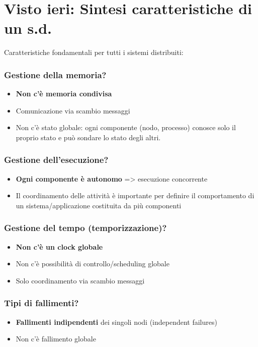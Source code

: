 \section{Visto ieri: Sintesi caratteristiche di un s.d.}
Caratteristiche fondamentali per tutti i sistemi distribuiti:
\subsubsection{Gestione della memoria?}
\begin{itemize}
    \item \textbf{Non c'è memoria condivisa}
    \item Comunicazione via scambio messaggi
    \item Non c'è stato globale: ogni componente (nodo, processo) conosce solo il proprio stato e può sondare lo stato degli altri.
\end{itemize}

\subsubsection{Gestione dell'esecuzione?}
\begin{itemize}
    \item \textbf{Ogni componente è autonomo} => esecuzione concorrente
    \item Il coordinamento delle attività è importante per definire il comportamento di un sistema/applicazione costituita da più componenti
\end{itemize}

\subsubsection{Gestione del tempo (temporizzazione)?}
\begin{itemize}
    \item \textbf{Non c'è un clock globale}
    \item Non c'è possibilità di controllo/scheduling globale
    \item Solo coordinamento via scambio messaggi
\end{itemize}

\subsubsection{Tipi di fallimenti?}
\begin{itemize}
    \item \textbf{Fallimenti indipendenti} dei singoli nodi (independent failures)
    \item Non c'è fallimento globale
\end{itemize}

